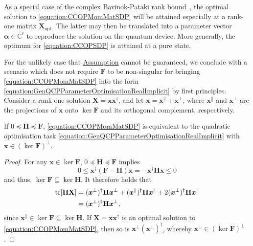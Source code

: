 \documentclass[10pt,conference]{IEEEtran}
\newcommand*{\C}{\mathbb{C}}          %
\begin{document}
As a special case of the complex Bavinok-Pataki rank bound~\cite{Huang2007ComplexMatrixDecompositionAndQuadraticProgramming}, the optimal solution to \eqref{equation:CCOPMomMatSDP} will be attained especially at a rank-one matrix $\mathbf{X}_{\text{opt}}$.
The latter may then be translated into a parameter vector $\bm{\alpha} \in \C^{\ell}$ to reproduce the solution on the quantum device.
More generally, the optimum for \eqref{equation:CCOPSDP} is attained at a pure state.

For the unlikely case that \hyperref[assumption:LinearIndependence]{Assumption} cannot be guaranteed, we conclude with a scenario which does not require $\mathbf{F}$ to be non-singular for bringing \eqref{equation:CCOPMomMatSDP} into the form \eqref{equation:GenQCPParameterOptimisationRealImplicit} by first principles.
Consider a rank-one solution $\mathbf{X} = \bm{x} \bm{x}^{\dag}$, and let $\bm{x} = \bm{x}^{\parallel} + \bm{x}^{\perp}$, where $\bm{x}^{\parallel}$ and $\bm{x}^{\perp}$ are the projections of $\bm{x}$ onto $\ker \mathbf{F}$ and its orthogonal complement, respectively.

\begin{proposition}\label{proposition:SDPtoQCQP}
    If $0 \preceq \mathbf{H} \preceq \mathbf{F}$, \eqref{equation:CCOPMomMatSDP} is equivalent to the quadratic optimisation task \eqref{equation:GenQCPParameterOptimisationRealImplicit} with $\bm{x} \in (\ker \mathbf{F})^{\perp}$.
\end{proposition}

\begin{proof}
    For any $\bm{x} \in \ker \mathbf{F}$, $0 \preceq \mathbf{H} \preceq \mathbf{F}$ implies
    \begin{equation}
        0 \leq \bm{x}^{\dag} (\mathbf{F} - \mathbf{H}) \bm{x} = - \bm{x}^{\dag} \mathbf{H} \bm{x} \leq 0
    \end{equation}
    and thus, $\ker \mathbf{F} \subseteq \ker \mathbf{H}$.
    It therefore holds that
    \begin{align*}
        \tr[\mathbf{H} \mathbf{X}] &= (\bm{x}^{\perp})^{\dag} \mathbf{H} \bm{x}^{\perp} +(\bm{x}^{\parallel})^{\dag} \mathbf{H} \bm{x}^{\parallel} + 2 (\bm{x}^{\perp})^{\dag} \mathbf{H} \bm{x}^{\parallel} \\
        &= (\bm{x}^{\perp})^{\dag} \mathbf{H} \bm{x}^{\perp},
    \end{align*}
    since $\bm{x}^{\parallel} \in \ker \mathbf{F} \subseteq \ker \mathbf{H}$.
    If $\mathbf{X} = \bm{x} \bm{x}^{\dag}$ is an optimal solution to \eqref{equation:CCOPMomMatSDP}, then so is $\bm{x}^{\perp} (\bm{x}^{\perp})^{\dag}$, whereby $\bm{x}^{\perp} \in (\ker \mathbf{F})^{\perp}$.
\end{proof}
\end{document}

